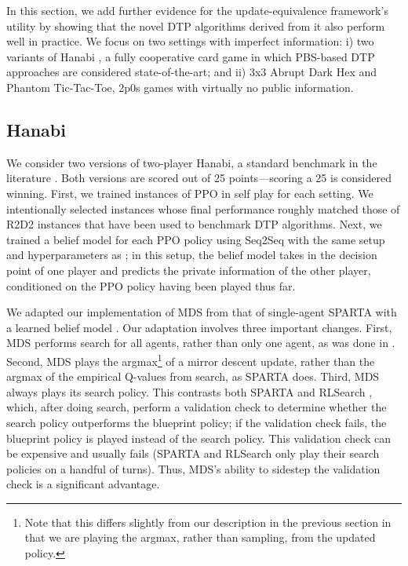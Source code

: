 \documentclass{article} %
\theoremstyle{plain}
\theoremstyle{definition}
\theoremstyle{remark}
\begin{document}
In this section, we add further evidence for the update-equivalence framework's utility by showing that the novel DTP algorithms derived from it also perform well in practice.
We focus on two settings with imperfect information: i) two variants of Hanabi \citep{BARD2020103216}, a fully cooperative card game in which PBS-based DTP approaches are considered state-of-the-art; and ii) 3x3 Abrupt Dark Hex and Phantom Tic-Tac-Toe, 2p0s games with virtually no public information.

\subsection{Hanabi} We consider two versions of two-player Hanabi, a standard benchmark in the literature \citep{BARD2020103216}.
Both versions are scored out of 25 points---scoring a 25 is considered winning.
First, we trained instances of PPO \citep{ppo} in self play for each setting.
We intentionally selected instances whose final performance roughly matched those of R2D2 \citep{r2d2} instances that have been used to benchmark DTP algorithms.
Next, we trained a belief model for each PPO policy using Seq2Seq with the same setup and hyperparameters as \citet{lbs}; in this setup, the belief model takes in the decision point of one player and predicts the private information of the other player, conditioned on the PPO policy having been played thus far.


We adapted our implementation of MDS from that of single-agent SPARTA with a learned belief model \citep{lbs}.
Our adaptation involves three important changes.
First, MDS performs search for all agents, rather than only one agent, as was done in \citep{lbs}.
Second, MDS plays the argmax\footnote{Note that this differs slightly from our description in the previous section in that we are playing the argmax, rather than sampling, from the updated policy.} of a mirror descent update, rather than the argmax of the empirical Q-values from search, as SPARTA does.
Third, MDS always plays its search policy.
This contrasts both SPARTA \citep{lerer2020improving,lbs} and RLSearch \citep{fickinger2021scalable}, which, after doing search, perform a validation check to determine whether the search policy outperforms the blueprint policy; if the validation check fails, the blueprint policy is played instead of the search policy.
This validation check can be expensive and usually fails (SPARTA and RLSearch only play their search policies on a handful of turns).
Thus, MDS's ability to sidestep the validation check is a significant advantage. 
\end{document}
